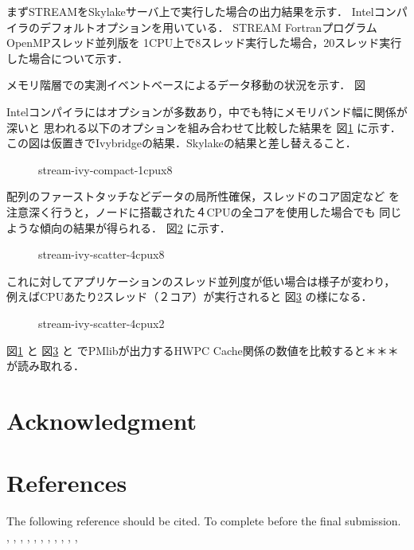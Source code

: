 \documentclass[conference]{IEEEtran}
\begin{document}
まずSTREAMをSkylakeサーバ上で実行した場合の出力結果を示す．
Intelコンパイラのデフォルトオプションを用いている．
STREAM FortranプログラムOpenMPスレッド並列版を
1CPU上で8スレッド実行した場合，20スレッド実行した場合について示す．

メモリ階層での実測イベントベースによるデータ移動の状況を示す．
図


Intelコンパイラにはオプションが多数あり，中でも特にメモリバンド幅に関係が深いと
思われる以下のオプションを組み合わせて比較した結果を
図\ref{fig:stream-ivy-compact-1cpux8} に示す．\\
{\color{blue}この図は仮置きでIvybridgeの結果．Skylakeの結果と差し替えること．}

\begin{figure}[bt]
\centering
\caption{stream-ivy-compact-1cpux8}
\label{fig:stream-ivy-compact-1cpux8}
\end{figure}


配列のファーストタッチなどデータの局所性確保，スレッドのコア固定など
を注意深く行うと，ノードに搭載された４CPUの全コアを使用した場合でも
同じような傾向の結果が得られる．
図\ref{fig:stream-ivy-scatter-4cpux8} に示す．\\

\begin{figure}[bt]
\centering
\caption{stream-ivy-scatter-4cpux8}
\label{fig:stream-ivy-scatter-4cpux8}
\end{figure}

これに対してアプリケーションのスレッド並列度が低い場合は様子が変わり，
例えばCPUあたり2スレッド（２コア）が実行されると
図\ref{fig:stream-ivy-scatter-4cpux2} の様になる．\\

\begin{figure}[bt]
\centering
\caption{stream-ivy-scatter-4cpux2}
\label{fig:stream-ivy-scatter-4cpux2}
\end{figure}

図\ref{fig:stream-ivy-compact-1cpux8} と
図\ref{fig:stream-ivy-scatter-4cpux2} と
でPMlibが出力するHWPC Cache関係の数値を比較すると＊＊＊
が読み取れる．


\section*{Acknowledgment}

\section*{References}

The following reference should be cited. To complete before the final submission.
\cite{PMlib:webpage-public},
\cite{PMlib:webpage-master},
\cite{PMlib:webpage-develop},
\cite{Extrae:webpage},
\cite{Scalasca:2017},
\cite{PAPI:5.6},
\cite{Intel:VTune},
\cite{PGI:Profiler},
\cite{stream:1995},
\cite{Scalasca:2010},
\cite{Williams:2009},



\end{document}
